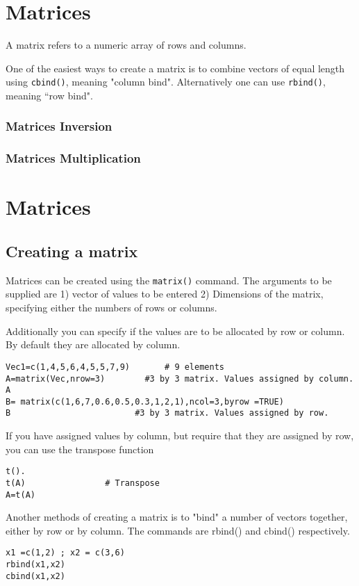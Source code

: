 \section{Matrices}
A matrix refers to a numeric array of rows and columns.

One of the easiest ways to create a matrix is to combine vectors of equal
length using \texttt{cbind()}, meaning "column bind". Alternatively one can use  \texttt{rbind()}, meaning ``row bind".


\subsubsection{Matrices Inversion}
\subsubsection{Matrices Multiplication}


\section{Matrices}
\subsection{Creating a matrix}
Matrices can be created using the \texttt{matrix()} command. The arguments to be supplied are 1) vector of values to be entered
2) Dimensions of the matrix, specifying either the numbers of rows or columns.

Additionally you can specify if the values are to be allocated by row or column. By default they are allocated by column.
\begin{verbatim}
Vec1=c(1,4,5,6,4,5,5,7,9)		# 9 elements
A=matrix(Vec,nrow=3)		#3 by 3 matrix. Values assigned by column.
A
B= matrix(c(1,6,7,0.6,0.5,0.3,1,2,1),ncol=3,byrow =TRUE)
B				          #3 by 3 matrix. Values assigned by row.
\end{verbatim}	
If you have assigned values by column, but require that they are assigned by row, you can use the transpose function
\begin{verbatim}
t().
t(A)				# Transpose
A=t(A)	
\end{verbatim}

Another methods of creating a matrix is to "bind" a number of vectors together, either by row or by column. The commands are rbind() and cbind() respectively.
\begin{verbatim}
x1 =c(1,2) ; x2 = c(3,6)
rbind(x1,x2)
cbind(x1,x2)
\end{verbatim}




